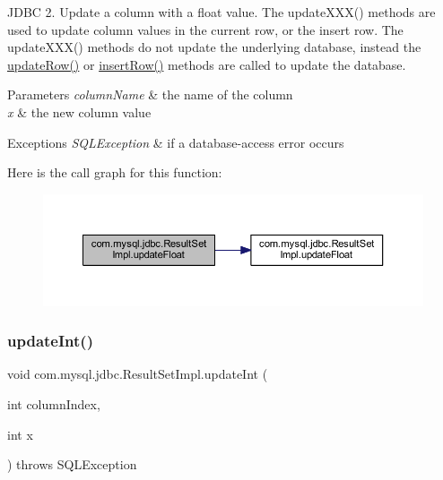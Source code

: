 J\+D\+BC 2. Update a column with a float value. The update\+X\+X\+X() methods are used to update column values in the current row, or the insert row. The update\+X\+X\+X() methods do not update the underlying database, instead the \mbox{\hyperlink{classcom_1_1mysql_1_1jdbc_1_1_result_set_impl_a2842d32292d023aaeeafedeed3322981}{update\+Row()}} or \mbox{\hyperlink{classcom_1_1mysql_1_1jdbc_1_1_result_set_impl_a78e304e3279cbcf60392f18c1385e3bf}{insert\+Row()}} methods are called to update the database.


\begin{DoxyParams}{Parameters}
{\em column\+Name} & the name of the column \\
\hline
{\em x} & the new column value\\
\hline
\end{DoxyParams}

\begin{DoxyExceptions}{Exceptions}
{\em S\+Q\+L\+Exception} & if a database-\/access error occurs \\
\hline
\end{DoxyExceptions}
Here is the call graph for this function\+:
\nopagebreak
\begin{figure}[H]
\begin{center}
\leavevmode
\includegraphics[width=350pt]{classcom_1_1mysql_1_1jdbc_1_1_result_set_impl_a075591244c917aa7694d8f5d6cfa8025_cgraph}
\end{center}
\end{figure}
\mbox{\label{classcom_1_1mysql_1_1jdbc_1_1_result_set_impl_ad21e446740a13919c3728733d0bf1f10}} 
\subsubsection{\texorpdfstring{update\+Int()}{updateInt()}\hspace{0.1cm}{\footnotesize\ttfamily [1/2]}}
{\footnotesize\ttfamily void com.\+mysql.\+jdbc.\+Result\+Set\+Impl.\+update\+Int (\begin{DoxyParamCaption}\item[{int}]{column\+Index,  }\item[{int}]{x }\end{DoxyParamCaption}) throws S\+Q\+L\+Exception}

